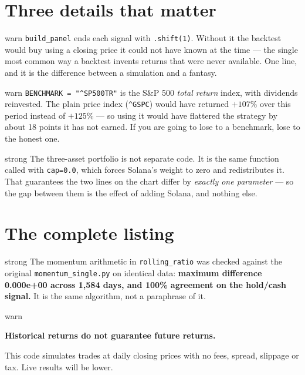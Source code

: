 \documentclass[11pt,a4paper]{article}
\begin{document}
\section{Three details that matter}

\begin{resultbox}{warn}
\texttt{build\_panel} ends each signal with \texttt{.shift(1)}. Without
it the backtest would buy using a closing price it could not have known
at the time --- the single most common way a backtest invents
returns that were never available. One line, and it is the difference
between a simulation and a fantasy.
\end{resultbox}

\begin{resultbox}{warn}
\texttt{BENCHMARK = "\^{}SP500TR"} is the S\&P 500 \emph{total return}
index, with dividends reinvested. The plain price index
(\texttt{\^{}GSPC}) would have returned $+107\%$ over this period
instead of $+125\%$ --- so using it would have flattered the strategy by
about 18 points it has not earned. If you are going to lose to a
benchmark, lose to the honest one.
\end{resultbox}

\begin{resultbox}[cap=0 is not a special case]{strong}
The three-asset portfolio is not separate code. It is the same function
called with \texttt{cap=0.0}, which forces Solana's weight to zero and
redistributes it. That guarantees the two lines on the chart differ by
\emph{exactly one parameter} --- so the gap between them is the effect
of adding Solana, and nothing else.
\end{resultbox}

\section{The complete listing}



\vspace{1em}

\begin{resultbox}[Verification]{strong}
The momentum arithmetic in \texttt{rolling\_ratio} was checked against
the original \texttt{momentum\_single.py} on identical data:
\textbf{maximum difference 0.000e+00 across 1{,}584 days, and 100\%
agreement on the hold/cash signal.} It is the same algorithm, not a
paraphrase of it.
\end{resultbox}

\begin{resultbox}[]{warn}
\begin{center}
\large\bfseries Historical returns do not guarantee future returns.
\end{center}
\vspace{0.2em}
\centering
This code simulates trades at daily closing prices with no fees,
spread, slippage or tax. Live results will be lower.
\end{resultbox}
\end{document}
